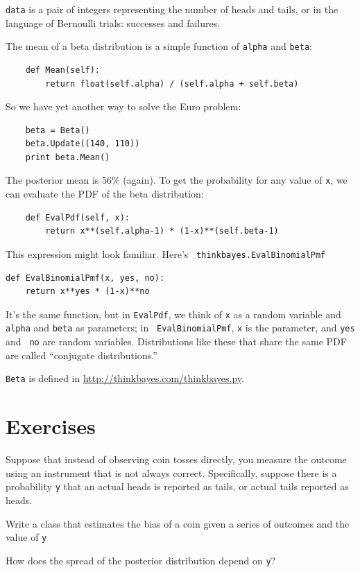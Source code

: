 \documentclass[12pt]{book}
\begin{document}
{\tt data} is a pair of integers representing the number of
heads and tails, or in the language of Bernoulli trials: successes
and failures.

The mean of a beta distribution is a simple function of {\tt alpha}
and {\tt beta}:

\begin{verbatim}
    def Mean(self):
        return float(self.alpha) / (self.alpha + self.beta)
\end{verbatim}

So we have yet another way to solve the Euro problem:

\begin{verbatim}
    beta = Beta()
    beta.Update((140, 110))
    print beta.Mean()
\end{verbatim}

The posterior mean is 56\% (again).  To get the probability for
any value of {\tt x}, we can evaluate the PDF of the beta
distribution:

\begin{verbatim}
    def EvalPdf(self, x):
        return x**(self.alpha-1) * (1-x)**(self.beta-1)
\end{verbatim}

This expression might look familiar.  Here's {\tt
  thinkbayes.EvalBinomialPmf}

\begin{verbatim}
def EvalBinomialPmf(x, yes, no): 
    return x**yes * (1-x)**no
\end{verbatim}

It's the same function, but in {\tt EvalPdf}, we think of {\tt x} as a
random variable and {\tt alpha} and {\tt beta} as parameters; in {\tt
  EvalBinomialPmf}, {\tt x} is the parameter, and {\tt yes} and {\tt
  no} are random variables.  Distributions like these that share the
same PDF are called ``conjugate distributions.''

{\tt Beta} is defined in \url{http://thinkbayes.com/thinkbayes.py}.


\section{Exercises}

\begin{exercise}

Suppose that instead of observing coin tosses directly, you measure
the outcome using an instrument that is not always correct.  Specifically,
suppose there is a probability {\tt y} that an actual heads is reported
as tails, or actual tails reported as heads.

Write a class that estimates the bias of a coin given a series of
outcomes and the value of {\tt y}

How does the spread of the posterior distribution depend on
{\tt y}?

\end{exercise}
\end{document}
